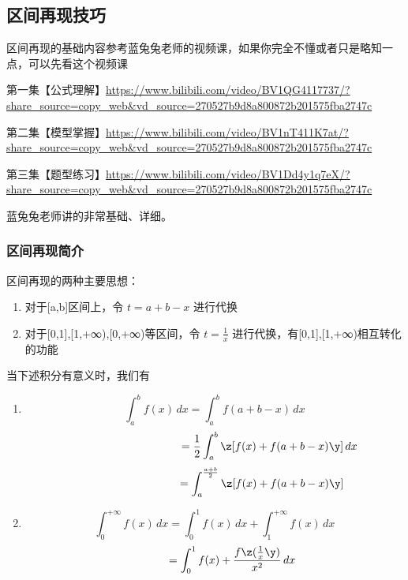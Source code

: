 \newpage   %



\subsection{区间再现技巧}
区间再现的基础内容参考蓝兔兔老师的视频课，如果你完全不懂或者只是略知一点，可以先看这个视频课

第一集【公式理解】\url{https://www.bilibili.com/video/BV1QG4117737/?share_source=copy_web&vd_source=270527b9d8a800872b201575fba2747c}

第二集【模型掌握】\url{https://www.bilibili.com/video/BV1nT411K7at/?share_source=copy_web&vd_source=270527b9d8a800872b201575fba2747c}

第三集【题型练习】\url{https://www.bilibili.com/video/BV1Dd4y1q7eX/?share_source=copy_web&vd_source=270527b9d8a800872b201575fba2747c}

蓝兔兔老师讲的非常基础、详细。

\subsubsection{区间再现简介}
区间再现的两种主要思想：
\begin{enumerate}
\item 对于[a,b]区间上，令 $ t = a + b - x $ 进行代换
\item 对于[0,1],[1,+∞),[0,+∞)等区间，令 $ t = \frac{1}{x} $ 进行代换，有[0,1],[1,+∞)相互转化的功能
\end{enumerate}

\begin{theorem}[区间再现恒等式]
当下述积分有意义时，我们有
\begin{enumerate}
\item \[\int_{a}^{b}f(x)\,dx=\int_{a}^{b}f(a+b-x)\,dx \] 
        \[\;\;\;\;\;\;\;\;\;\;\;\;\;\;\;\;\;\;\;\;\;\;\;\;\;\;\;\;\;\;\;\;\;\;\;\;=\frac{1}{2}\int_{a}^{b}\z[f(x)+f(a+b-x)\y] \,dx \]
        \[\;\;\;\;\;\;\;\;\;\;\;\;\;\;\;\;\;\;\;\;\;\;\;\;\;\;\;\;\;\;\;=\int_{a}^{\frac{a+b}{2}}\z[f(x)+f(a+b-x)\y] \]
\item \[ \int_{0}^{+\infty} f(x)\,dx 
        = \int_{0}^{1} f(x)\,dx+\int_{1}^{+\infty} f(x)\,dx\]
        \[ \;\;\;\;\;\;\;\;\;\;\;\;=\int_{0}^{1} f(x)+\frac{f\z(\frac{1}{x}\y)}{x^2} \,dx\]
\end{enumerate}

\end{theorem}


